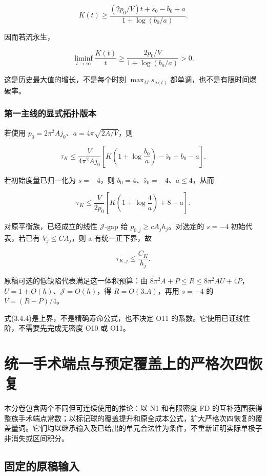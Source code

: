 \documentclass[UTF8,11pt,openany,fontset=none]{ctexbook}
\theoremstyle{definition}
\theoremstyle{remark}
\begin{document}
\[
 \boxed{
 K(t)\ge
 \frac{(2p_0/V)t+\bar s_0-b_0+a}
 {1+\log(b_0/a)}.
 }
\tag{3.4.1}
\]

因而若流永生，

\[
 \liminf_{t\to\infty}\frac{K(t)}t
 \ge\frac{2p_0/V}{1+\log(b_0/a)}>0.
\]

这是历史最大值的增长，不是每个时刻 \(\max_Ms_{g(t)}\) 都单调，也不是有限时间爆破率。

\subsection{第一主线的显式拓扑版本}\label{v3-ux7b2cux4e00ux4e3bux7ebfux7684ux663eux5f0fux62d3ux6251ux7248ux672c}

若使用 \(p_0=2\pi^2Aj_0\)、\(a=4\pi\sqrt{2A/V}\)，则

\[
 \boxed{
 \tau_K\le\frac{V}{4\pi^2Aj_0}
 \left[K\left(1+\log\frac{b_0}{a}\right)-\bar s_0+b_0-a\right].
 }
\tag{3.4.2}
\]

若初始度量已归一化为 \(s=-4\)，则 \(b_0=4\)、\(\bar s_0=-4\)、\(a\le4\)，从而

\[
 \boxed{
 \tau_K\le\frac{V}{2p_0}
 \left[K\left(1+\log\frac4a\right)+8-a\right].
 }
\tag{3.4.3}
\]

对原平衡族，已经成立的线性 \(\mathcal J\)-gap 给 \(p_{0,j}\ge cA_jh_j\)。对选定的 \(s=-4\) 初始代表，若已有 \(V_j\le C A_j\)，则 a 有统一正下界，故

\[
 \boxed{\tau_{K,j}\le\frac{C_K}{h_j}.}
\tag{3.4.4}
\]

原稿可选的低缺陷代表满足这一体积预算：由 \(8\pi^2A+P\le R\le8\pi^2AU+4P\)， \(U=1+O(h)\)、\(\mathcal J=O(h)\)，得 \(R=O(3.A)\)，再用 \(s=-4\) 的 \(V=(R-P)/4\)。

式(3.4.4)是上界，不是精确寿命公式，也不决定 O11 的系数。它使用已证线性阶，不需要先完成无密度 O10 或 O11。


\chapter{统一手术端点与预定覆盖上的严格次四恢复}
本分卷包含两个不同但可连续使用的推论：以 N1 和有限密度 FD 的互补范围获得整族手术端点常数；以标记球的覆盖提升和原全成本公式，扩大严格次四恢复的覆盖量词。它们均以继承输入及已给出的单元合法性为条件，不重新证明实际单极子非消失或区间积分。\cite{R03,I01,I02,B01}

\section{固定的原稿输入}\label{v4-ux56faux5b9aux7684ux539fux7a3fux8f93ux5165}
\end{document}
